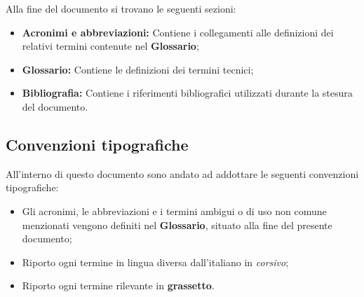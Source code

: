 Alla fine del documento si trovano le seguenti sezioni:
\begin{itemize}
    \item \textbf{Acronimi e abbreviazioni:} Contiene i collegamenti alle definizioni dei relativi termini contenute nel \textbf{Glossario};
    \item \textbf{Glossario:} Contiene le definizioni dei termini tecnici;
    \item \textbf{Bibliografia:} Contiene i riferimenti bibliografici utilizzati durante la stesura del documento.
\end{itemize}
\pagebreak

\subsection*{Convenzioni tipografiche}
All'interno di questo documento sono andato ad addottare le seguenti convenzioni tipografiche:
\begin{itemize}
    \item Gli acronimi, le abbreviazioni e i termini ambigui o di uso non comune menzionati vengono definiti nel \textbf{Glossario}, situato alla fine del presente documento;
    \item Riporto ogni termine in lingua diversa dall'italiano in \textit{corsivo};
    \item Riporto ogni termine rilevante in \textbf{grassetto}.
\end{itemize}





\endgroup

\vfill
